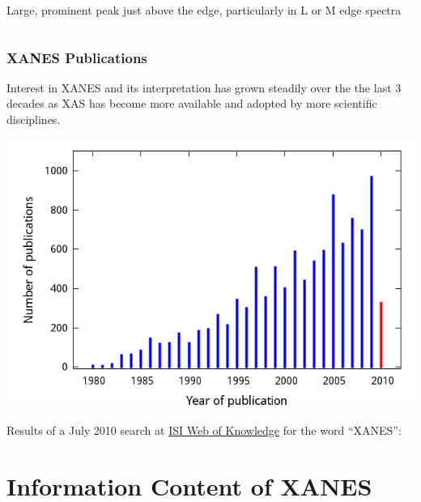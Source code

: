 \documentclass[10pt, xcolor=x11names, compress]{beamer}
\begin{document}
\begin{frame}
\begin{columns}[T]
\begin{column}{0.5\linewidth}
      \begin{description}[wh]
      \item[{\color{Blue3}white line}] Large, prominent peak just
        above the edge, particularly in L or M edge spectra
      \end{description}
    \end{column}    
  \end{columns}
\end{frame}

\begin{frame}
  \frametitle{XANES Publications}

  Interest in XANES and its interpretation has grown steadily over the
  the last 3 decades as XAS has become more available and adopted by
  more scientific disciplines.

  \begin{center}
    \includegraphics[width=0.75\linewidth]{images/pubs/xanes_pubs.png}

    \tiny Results of a July 2010 search at
    \href{http://pcs.isiknowledge.com/} {\color{Blue4}ISI Web of
      Knowledge} for the word ``XANES'':
  \end{center}
\end{frame}

\section[Information]{Information Content of XANES}
\end{document}
